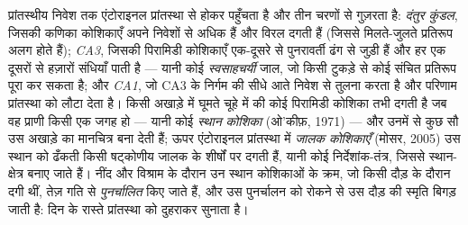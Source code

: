 \begin{definition}[हिप्पोकैम्पसी परिपथ]\label{def:b3:learning-memory:hippocampus}
प्रांतस्थीय निवेश  तक एंटोराइनल प्रांतस्था से होकर पहुँचता
है और तीन चरणों से गुज़रता है: \emph{दंतुर कुंडल}, जिसकी कणिका
कोशिकाएँ अपने निवेशों से अधिक हैं और विरल दगती हैं (जिससे मिलते-जुलते
प्रतिरूप अलग होते हैं); \emph{CA3}, जिसकी पिरामिडी कोशिकाएँ एक-दूसरे से
पुनरावर्ती ढंग से जुड़ी हैं और हर एक दूसरों से हज़ारों संधियाँ पाती है
--- यानी कोई \emph{स्वसाहचर्यी} जाल, जो किसी टुकड़े से कोई संचित
प्रतिरूप पूरा कर सकता है; और \emph{CA1}, जो CA3 के निर्गम की सीधे आते
निवेश से तुलना करता है और परिणाम प्रांतस्था को लौटा देता है। किसी
अखाड़े में घूमते चूहे में  की कोई पिरामिडी कोशिका तभी दगती
है जब वह प्राणी किसी एक जगह हो --- यानी कोई \emph{स्थान कोशिका}
(ओ'कीफ़, 1971) --- और उनमें से कुछ सौ उस अखाड़े का मानचित्र बना देती
हैं; ऊपर एंटोराइनल प्रांतस्था में \emph{जालक कोशिकाएँ} (मोसर, 2005) उस
स्थान को ढँकती किसी षट्कोणीय जालक के शीर्षों पर दगती हैं, यानी कोई
निर्देशांक-तंत्र, जिससे स्थान-क्षेत्र बनाए जाते हैं। नींद और विश्राम के
दौरान उन स्थान कोशिकाओं के क्रम, जो किसी दौड़ के दौरान दगी थीं, तेज़
गति से \emph{पुनर्चालित} किए जाते हैं, और उस पुनर्चालन को रोकने से उस
दौड़ की स्मृति बिगड़ जाती है:  दिन के रास्ते प्रांतस्था को
दुहराकर सुनाता है।
\end{definition}

